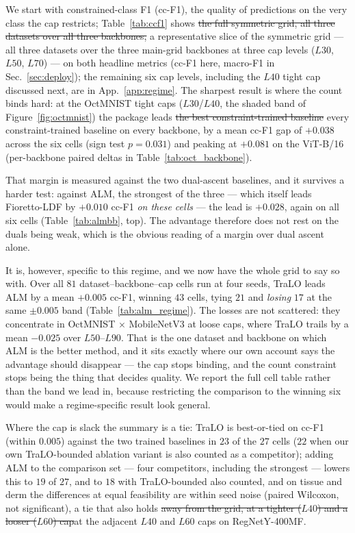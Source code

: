 \documentclass[10pt]{article}
\newcommand{\del}[1]{{\color{red}\sout{#1}}}
\begin{document}
We start with constrained-class F1 (cc-F1), the quality of predictions on
the very class the cap restricts; Table~\ref{tab:ccf1} shows \del{the full
symmetric grid, all three datasets over all three backbones,}%
{\color{blue}a representative slice of the symmetric grid --- all three datasets
over the three main-grid backbones at three cap levels ($L30$, $L50$, $L70$) ---}
on both
headline metrics (cc-F1 here, macro-F1 in Sec.~\ref{sec:deploy}){\color{blue};
the remaining six cap levels, including the $L40$ tight cap discussed next, are
in App.~\ref{app:regime}}. The
sharpest result is where the count binds hard: at the OctMNIST tight caps
($L30$/$L40$, the shaded band of Figure~\ref{fig:octmnist}) the package
leads \del{the best constraint-trained baseline}%
{\color{blue}every constraint-trained baseline} on every backbone, by a mean
cc-F1 gap of $+0.038$ across the six cells (sign test $p{=}0.031$) and
peaking at $+0.081$ on the ViT-B/16 (per-backbone paired deltas in
Table~\ref{tab:oct_backbone}).
{\color{blue}That margin is measured against the two dual-ascent baselines, and
it survives a harder test: against ALM, the strongest of the three --- which
itself leads Fioretto-LDF by $+0.010$ cc-F1 \emph{on these cells} --- the lead is
$+0.028$, again on
all six cells (Table~\ref{tab:almbb}, top). The advantage therefore does not rest
on the duals being weak, which is the obvious reading of a margin over dual ascent
alone.

It is, however, specific to this regime, and we now have the whole grid to say so
with. Over all $81$ dataset--backbone--cap cells run at four seeds, TraLO leads
ALM by a mean $+0.005$ cc-F1, winning $43$ cells, tying $21$ and \emph{losing}
$17$ at the same $\pm0.005$ band (Table~\ref{tab:alm_regime}). The losses are not
scattered: they concentrate in OctMNIST $\times$ MobileNetV3 at loose caps, where
TraLO trails by a mean $-0.025$ over $L50$--$L90$. That is the one dataset and
backbone on which ALM is the better method, and it sits exactly where our own
account says the advantage should disappear --- the cap stops binding, and the
count constraint stops being the thing that decides quality. We report the full
cell table rather than the band we lead in, because restricting the comparison to
the winning six would make a regime-specific result look general.}
Where the cap is slack the summary is a tie:
TraLO is best-or-tied on cc-F1 (within $0.005$) against the two trained
baselines in $23$ of the $27$ cells ($22$ when our own TraLO-bounded
ablation variant is also counted as a competitor){\color{blue}; adding ALM to the
comparison set --- four competitors, including the strongest --- lowers this to
$19$ of $27$, and to $18$ with TraLO-bounded also counted}, and on tissue and derm
the differences at equal feasibility are within seed noise (paired
Wilcoxon, not significant), a tie that also holds \del{away from the grid, at a
tighter ($L40$) and a looser ($L60$) cap}{\color{blue}at the adjacent $L40$ and
$L60$ caps} on RegNet{\color{blue}Y-400MF}.
\end{document}
